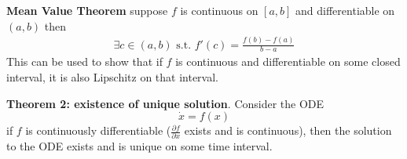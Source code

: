 \textbf{Mean Value Theorem} 
suppose \(f\) is continuous on \([a,b]\) and differentiable on \((a,b)\) then
\begin{align*}
    \exists c\in(a,b) \textrm{ s.t. } f'(c)=\frac{f(b)-f(a)}{b-a}
\end{align*}
This can be used to show that if \(f\) is continuous and differentiable on some closed interval, it is also
Lipschitz on that interval.
\newline

\textbf{Theorem 2: existence of unique solution}. Consider the ODE
\[\dot{x}=f(x)\]
if \(f\) is continuously differentiable (\(\frac{\partial f}{\partial x}\) exists and is continuous), then the solution to the ODE exists and is unique on some time interval.

